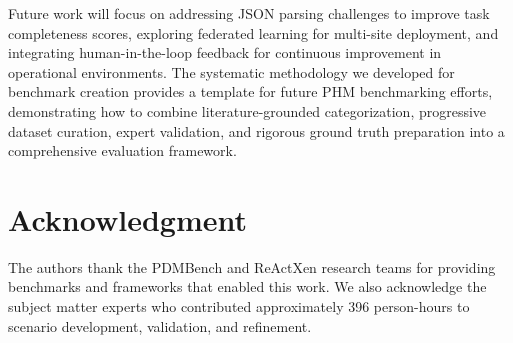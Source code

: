 \documentclass[conference]{IEEEtran}
\begin{document}
Future work will focus on addressing JSON parsing challenges to improve task completeness scores, exploring federated learning for multi-site deployment, and integrating human-in-the-loop feedback for continuous improvement in operational environments. The systematic methodology we developed for benchmark creation provides a template for future PHM benchmarking efforts, demonstrating how to combine literature-grounded categorization, progressive dataset curation, expert validation, and rigorous ground truth preparation into a comprehensive evaluation framework.

\section*{Acknowledgment}

The authors thank the PDMBench and ReActXen research teams for providing benchmarks and frameworks that enabled this work. We also acknowledge the subject matter experts who contributed approximately 396 person-hours to scenario development, validation, and refinement.



\end{document}
